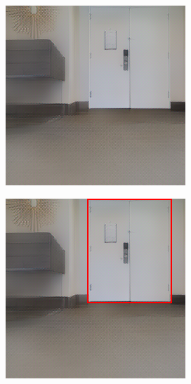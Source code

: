 \begin{figure}[h!]
	\centering
	\begin{subfigure}[b]{\linewidth}
		\centering
		\begin{subfigure}[b]{0.4\linewidth}
			\includegraphics[width=\textwidth]{images/correct_box_rgb_1.png}
		\end{subfigure}
		\hfil
		\begin{subfigure}[b]{0.4\linewidth}
			\includegraphics[width=\textwidth]{images/correct_box_box_1.png}

\end{subfigure}
\end{subfigure}
\end{figure}
